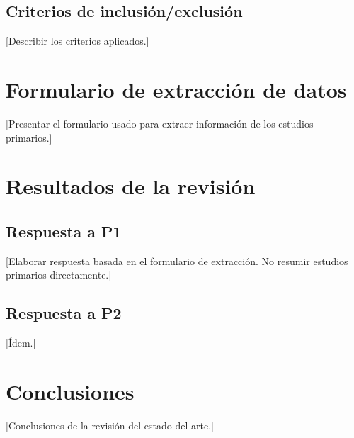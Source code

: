 \subsection{Criterios de inclusión/exclusión}
[Describir los criterios aplicados.]

\section{Formulario de extracción de datos}
[Presentar el formulario usado para extraer información
de los estudios primarios.]

\section{Resultados de la revisión}

\subsection{Respuesta a P1}
[Elaborar respuesta basada en el formulario de extracción.
No resumir estudios primarios directamente.]

\subsection{Respuesta a P2}
[Ídem.]

\section{Conclusiones}
[Conclusiones de la revisión del estado del arte.]
